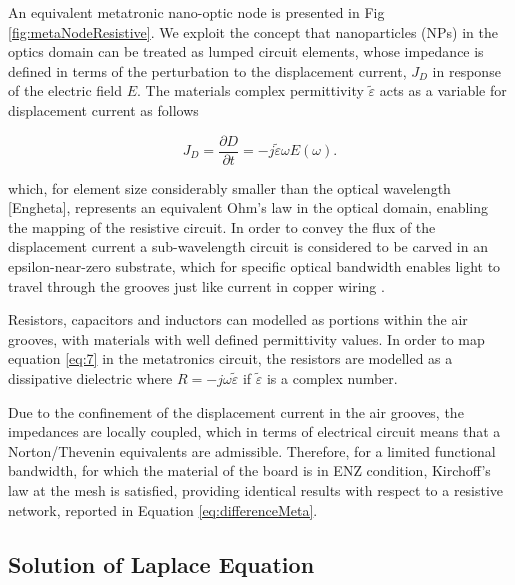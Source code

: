 \par An equivalent metatronic nano-optic node is presented in Fig \ref{fig:metaNodeResistive}. 
We exploit the concept that nanoparticles (NPs) in the optics domain can be treated as lumped circuit elements,  whose impedance is defined in terms of the perturbation to the displacement current, $J_D$ in response of the electric field $E$. The materials complex permittivity $\widetilde{\varepsilon}$ acts as a variable for displacement current as follows

\begin{equation}
   J_D = \frac{\partial D}{\partial t} = -j \widetilde{\varepsilon} \omega E(\omega).
   \label{eq:12345}
\end{equation}

\par which, for element size considerably smaller than the optical wavelength [Engheta], represents an equivalent Ohm's law in the optical domain, enabling the mapping of the resistive circuit. In order to convey the flux of the displacement current a sub-wavelength circuit is considered to be carved in an epsilon-near-zero substrate, which for specific optical bandwidth enables light to travel through the grooves just like current in copper wiring \cite{alu2007epsilon}.

\par Resistors, capacitors and inductors can modelled as portions within the air grooves, with materials with well defined permittivity values. In order to map equation \ref{eq:7} in the metatronics circuit, the resistors are modelled as a dissipative dielectric where $R = -j\omega\widetilde{\varepsilon}$ if $\widetilde{\varepsilon}$ is a complex number. 

\par Due to the confinement of the displacement current in the air grooves, the impedances are locally coupled, which in terms of electrical circuit means that a Norton/Thevenin equivalents are admissible. Therefore, for a limited functional bandwidth, for which the material of the board is in ENZ condition, Kirchoff's law at the mesh is satisfied, providing identical results with respect to a resistive network, reported in Equation \ref{eq:differenceMeta}. 

\subsection{\label{sec:PHYSICS3} Solution of Laplace Equation}

